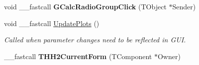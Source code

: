 \begin{DoxyCompactItemize}
\item 
\hypertarget{class_t_h_h2_current_form_afaaaeff7de4d15315e10f730f2473b13}{void \+\_\+\+\_\+fastcall {\bfseries G\+Calc\+Radio\+Group\+Click} (T\+Object $\ast$Sender)}\label{class_t_h_h2_current_form_afaaaeff7de4d15315e10f730f2473b13}

\item 
\hypertarget{class_t_h_h2_current_form_a28b7fd7d9515c8ef9cd706b9bc8bf435}{void \+\_\+\+\_\+fastcall \hyperlink{class_t_h_h2_current_form_a28b7fd7d9515c8ef9cd706b9bc8bf435}{Update\+Plots} ()}\label{class_t_h_h2_current_form_a28b7fd7d9515c8ef9cd706b9bc8bf435}

\begin{DoxyCompactList}\small\item\em Called when parameter changes need to be reflected in G\+U\+I. \end{DoxyCompactList}\item 
\hypertarget{class_t_h_h2_current_form_ade431854044d6b9454793bb03fbdc727}{\+\_\+\+\_\+fastcall {\bfseries T\+H\+H2\+Current\+Form} (T\+Component $\ast$Owner)}\label{class_t_h_h2_current_form_ade431854044d6b9454793bb03fbdc727}

\end{DoxyCompactItemize}
